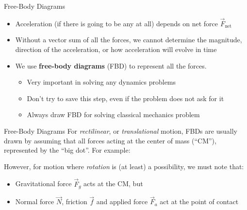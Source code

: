 \documentclass[12pt,compress,aspectratio=169]{beamer}
\begin{document}
\begin{frame}{Free-Body Diagrams}
  \begin{itemize}
  \item Acceleration (if there is going to be any at all) depends
    on net force $\vec F_\text{net}$
  \item Without a vector sum of all the forces, we cannot determine the
    magnitude, direction of the acceleration, or how acceleration will evolve
    in time
  \item We use \textbf{free-body diagrams} (FBD) to represent all the forces.
    \begin{itemize}
    \item Very important in solving any dynamics problems
    \item Don't try to save this step, even if the problem does not ask for it
    \item Always draw FBD for solving classical mechanics problem
    \end{itemize}
  \end{itemize}
\end{frame}



\begin{frame}{Free-Body Diagrams}
  For \emph{rectilinear}, or \emph{translational} motion, FBDs are usually drawn
  by assuming that all forces acting at the center of mass (``CM''),
  represented by the ``big dot''. For example:
  \begin{center}
  \end{center}
  However, for motion where \emph{rotation} is (at least) a possibility, we
  must note that:
  \begin{itemize}
  \item Gravitational force $\vec F_g$ acts at the CM, but
  \item Normal force $\vec N$, friction $\vec f$ and applied force $\vec F_a$
    act at the point of contact
  \end{itemize}
\end{frame}
\end{document}
